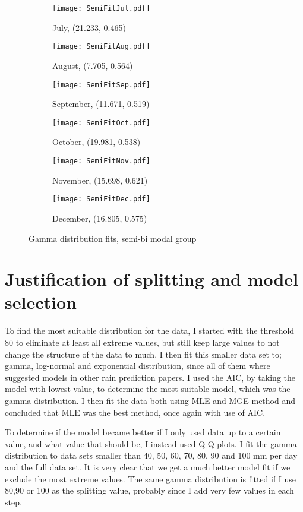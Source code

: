 \documentclass{article}
\begin{document}
	\begin{figure}[H]
		\ContinuedFloat
		\centering
		\begin{subfigure}{0.5\textwidth}
			\centering
			\texttt{[image: SemiFitJul.pdf]}
			\caption{July, (21.233, 0.465)}
		\end{subfigure}%
		\begin{subfigure}{0.5\textwidth}
			\centering
			\texttt{[image: SemiFitAug.pdf]}
			\caption{August, (7.705, 0.564)}
		\end{subfigure}
		\begin{subfigure}{0.5\textwidth}
			\centering
			\texttt{[image: SemiFitSep.pdf]}
			\caption{September, (11.671, 0.519)}
		\end{subfigure}%
		\begin{subfigure}{0.5\textwidth}
			\centering
			\texttt{[image: SemiFitOct.pdf]}
			\caption{October, (19.981, 0.538)}
		\end{subfigure}
		\begin{subfigure}{0.5\textwidth}
			\texttt{[image: SemiFitNov.pdf]}
			\caption{November, (15.698, 0.621)}
		\end{subfigure}%
		\begin{subfigure}{0.5\textwidth}
			\texttt{[image: SemiFitDec.pdf]}
			\caption{December, (16.805, 0.575)}
		\end{subfigure}
		\caption{Gamma distribution fits, semi-bi modal group}
	\end{figure}
	
	\section{Justification of splitting and model selection}
	To find the most suitable distribution for the data, I started with the threshold 80 to eliminate at least all extreme values, but still keep large values to not change the structure of the data to much. I then fit this smaller data set to; gamma, log-normal and exponential distribution, since all of them where suggested models in other rain prediction papers. I used the AIC, by taking the model with lowest value, to determine the most suitable model, which was the gamma distribution. I then fit the data both using MLE and MGE method and concluded that MLE was the best method, once again with use of AIC.
	
	To determine if the model became better if I only used data up to a certain value, and what value that should be, I instead used Q-Q plots. I fit the gamma distribution to data sets smaller than 40, 50, 60, 70, 80, 90 and 100 mm per day and the full data set. It is very clear that we get a much better model fit if we exclude the most extreme values. The same gamma distribution is fitted if I use 80,90 or 100 as the splitting value, probably since I add very few values in each step. 
	
\end{document}
